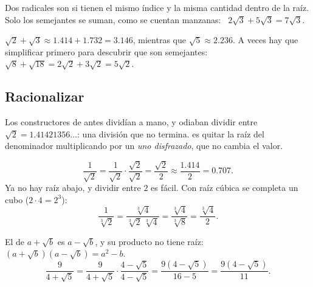 \documentclass[11pt,a4paper]{article}
\begin{document}
\begin{definicion}
Dos radicales son  si tienen el mismo índice y la misma cantidad dentro de la raíz. Solo los semejantes
se suman, como se cuentan manzanas: \ $2\sqrt3+5\sqrt3=7\sqrt3$.
\end{definicion}
\begin{ojo}
$\sqrt2+\sqrt3\approx1.414+1.732=3.146$, mientras que $\sqrt5\approx2.236$. A veces hay que simplificar primero para
descubrir que son semejantes: $\sqrt8+\sqrt{18}=2\sqrt2+3\sqrt2=5\sqrt2$.
\end{ojo}

\subsection{Racionalizar}
Los constructores de antes dividían a mano, y odiaban dividir entre $\sqrt2=1.41421356\ldots$: una división que no termina.
 es quitar la raíz del denominador multiplicando por un \emph{uno disfrazado}, que no cambia el valor.
\begin{ejemplo}
\[ \frac1{\sqrt2}=\frac1{\sqrt2}\cdot\frac{\sqrt2}{\sqrt2}=\frac{\sqrt2}{2}\approx\frac{1.414}{2}=0.707. \]
Ya no hay raíz abajo, y dividir entre $2$ es fácil. Con raíz cúbica se completa un cubo ($2\cdot4=2^3$):
\[ \frac{1}{\sqrt[3]{2}}=\frac{\sqrt[3]{4}}{\sqrt[3]{2}\,\sqrt[3]{4}}=\frac{\sqrt[3]{4}}{\sqrt[3]{8}}=\frac{\sqrt[3]{4}}{2}. \]
\end{ejemplo}
\begin{ejemplo}
El  de $a+\sqrt b$ es $a-\sqrt b$, y su producto no tiene raíz: $(a+\sqrt b)(a-\sqrt b)=a^{2}-b$.
\[ \frac{9}{4+\sqrt5}=\frac{9}{4+\sqrt5}\cdot\frac{4-\sqrt5}{4-\sqrt5}=\frac{9\left(4-\sqrt5\right)}{16-5}=\frac{9\left(4-\sqrt5\right)}{11}. \]
\end{ejemplo}
\end{document}
